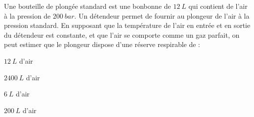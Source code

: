 
\finEntrainement






\hauteurLargeurCadreReponse		{7mm}{1.5cm}
\initialisationEntrainement


\debutEntrainement


\begin{enonce}
Une bouteille de plongée standard est une bonbonne de $\SI{12}{L}$ qui contient de l'air à la pression de $\SI{200}{bar}$. Un détendeur permet de fournir au plongeur de l'air à la pression standard. En supposant que la température de l'air en entrée et en sortie du détendeur est constante, et que l'air se comporte comme un gaz parfait, on peut estimer que le plongeur dispose d'une réserve respirable de :
	
	\begin{listeQCM2Colonnes}
	\item $\SI{12}{L}$ d'air
	\item $\SI{2400}{L}$ d'air
	\item $\SI{6}{L}$ d'air
	\item $\SI{200}{L}$ d'air
	\end{listeQCM2Colonnes}

\end{enonce}

\reponse{\reponseB{}}

